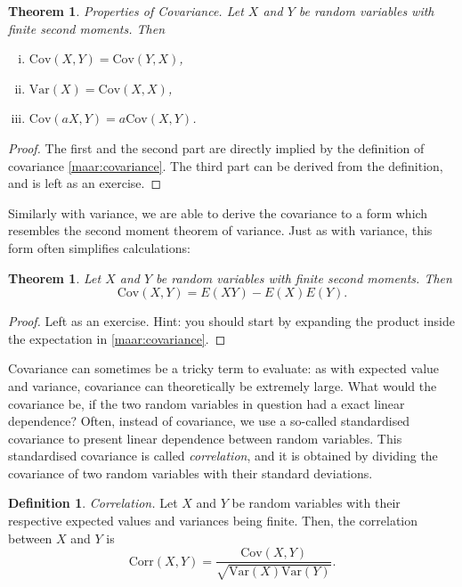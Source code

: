 \documentclass[12pt,a4paper,leqno]{report}
\newcommand{\var}{\mathrm{Var}}
\newcommand{\cov}{\mathrm{Cov}}
\newcommand{\corr}{\mathrm{Corr}}
\theoremstyle{plain}
\newtheorem{lause}[equation]{Theorem}
\theoremstyle{definition}
\newtheorem{maar}[equation]{Definition}
\begin{document}
\begin{lause}
Properties of Covariance. Let $X$ and $Y$ be random variables with finite second moments. Then
\begin{enumerate}[(i)]
\item $\cov(X,Y) = \cov(Y, X)$,
\item $\var(X) = \cov(X,X)$,
\item $\cov(aX, Y) = a \cov(X,Y)$.
\end{enumerate}
\end{lause}

\begin{proof}
The first and the second part are directly implied by the definition of covariance \ref{maar:covariance}. The third part can be derived from the definition, and is left as an exercise.
\end{proof}

Similarly with variance, we are able to derive the covariance to a form which resembles the second moment theorem of variance. Just as with variance, this form often simplifies calculations:

\begin{lause} \label{lause:covariance}
Let $X$ and $Y$ be random variables with finite second moments. Then
\[
\cov(X,Y) = E(XY) - E(X)E(Y).
\]
\end{lause}

\begin{proof}
Left as an exercise. Hint: you should start by expanding the product inside the expectation in \ref{maar:covariance}.
\end{proof}

\bigskip

Covariance can sometimes be a tricky term to evaluate: as with expected value and variance, covariance can theoretically be extremely large. What would the covariance be, if the two random variables in question had a exact linear dependence? Often, instead of covariance, we use a so-called standardised covariance to present linear dependence between random variables. This standardised covariance is called \emph{correlation}, and it is obtained by dividing the covariance of two random variables with their standard deviations.

\begin{maar}\label{maar:correlation}
\emph{Correlation.} Let $X$ and $Y$ be random variables with their respective expected values and variances being finite. Then, the correlation between $X$ and $Y$ is 
\[
\corr(X,Y) = \frac{\cov(X,Y)}{\sqrt{\var(X)\var(Y)}}.
\]
\end{maar}
\end{document}
